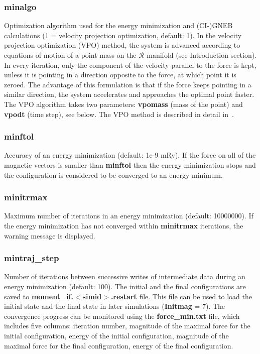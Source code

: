 \documentclass{article}
\begin{document}
\subsubsection*{minalgo}
Optimization algorithm used for the energy minimization and (CI-)GNEB calculations (1 = velocity projection optimization, default: 1). In the velocity projection optimization (VPO) method, the system is advanced according to equations of motion of a point mass on the $\mathcal{R}$-manifold (see Introduction section). In every iteration, only the component of the velocity parallel to the force is kept, unless it is pointing in a direction opposite to the force, at which point it is zeroed. The advantage of this formulation is that if the force keeps pointing in a similar direction, the system accelerates and approaches the optimal point faster. The VPO algorithm takes two parameters: {\bf vpomass} (mass of the point) and {\bf vpodt} (time step), see below. The VPO method is described in detail in~\cite{bessarab_2015}.

\subsubsection*{minftol}
Accuracy of an energy minimization (default: 1e-9 mRy). If the force on all of the magnetic vectors is smaller than {\bf minftol} then the energy minimization stops and the configuration is considered to be converged to an energy minimum.

\subsubsection*{minitrmax}
Maximum number of iterations in an energy minimization (default: 10000000). If the energy minimization has not converged within {\bf minitrmax} iterations, the warning message is displayed.

\subsubsection*{mintraj\_step}
Number of iterations between successive writes of intermediate data during an energy minimization (default: 100). The initial and the final configurations are saved to {\bf moment\_if.$<$simid$>$.restart} file. This file can be used to load the initial state and the final state in later simulations ({\bf Initmag} = 7). The convergence progress can be monitored using the {\bf force\_min.txt} file, which includes five columns: iteration number, magnitude of the maximal force for the initial configuration, energy of the initial configuration, magnitude of the maximal force for the final configuration, energy of the final configuration.
\end{document}
